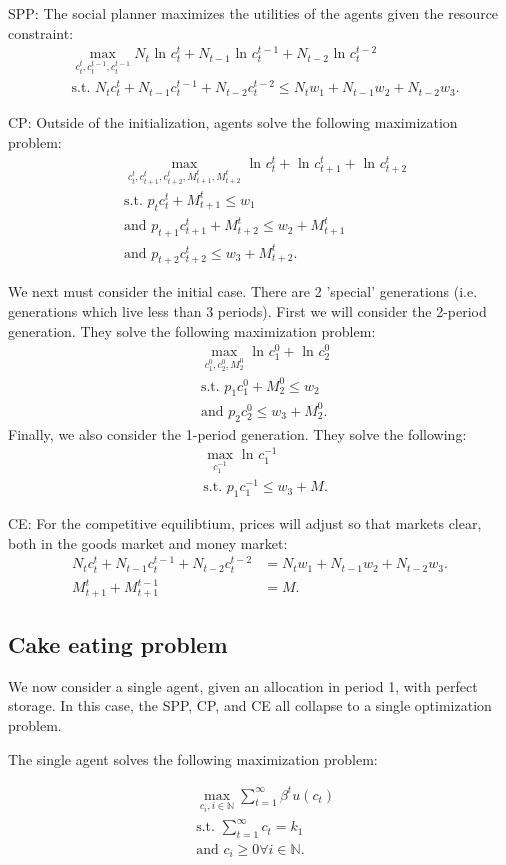 \documentclass[11pt]{article} %
\begin{document}
SPP: The social planner maximizes the utilities of the agents given the resource constraint: 
\begin{align*}
&\max_{c_t^{t},c_{t}^{t-1},c_{t}^{t-1}} N_{t}\text{ ln } c_{t}^{t} + N_{t-1}\text{ ln } c_{t}^{t-1} + N_{t-2}\text{ ln } c_{t}^{t-2}\\
&\text{s.t. }  N_{t}c_{t}^{t} +  N_{t-1}c_{t}^{t-1} + N_{t-2}c_{t}^{t-2}\leq N_{t}w_1 + N_{t-1}w_2 + N_{t-2}w_3.
\end{align*}


CP: Outside of the initialization, agents solve the following maximization problem:
\begin{align*}
&\max_{c_t^{t},c_{t+1}^{t},c_{t+2}^{t},M_{t+1}^{t},M_{t+2}^{t}} \text{ ln } c_{t}^{t} + \text{ ln } c_{t+1}^{t}+ \text{ ln } c_{t+2}^{t}\\
&\text{s.t. }  p_t c_{t}^{t} + M_{t+1}^t \leq w_1 \\
& \text{and } p_{t+1} c_{t+1}^t  + M_{t+2}^t \leq  w_2 + M_{t+1}^t \\
& \text{and } p_{t+2} c_{t+2}^t \leq w_3 + M_{t+2}^t.
\end{align*}

We next must consider the initial case. There are 2 'special' generations (i.e. generations which live less than 3 periods). First we will consider the 2-period generation. They solve the following maximization problem:
\begin{align*}
&\max_{c_{1}^{0},c_{2}^{0},M_{2}^{0}}  \text{ ln } c_{1}^{0}+ \text{ ln } c_{2}^{0}\\
& \text{s.t. } p_{1} c_{1}^0  + M_{2}^0 \leq  w_2 \\
& \text{and } p_{2} c_{2}^0 \leq w_3 + M_{2}^0.
\end{align*}
Finally, we also consider the 1-period generation. They solve the following:
\begin{align*}
&\max_{c_{1}^{-1}}  \text{ ln } c_{1}^{-1}\\
& \text{s.t. } p_{1} c_{1}^{-1} \leq w_3 + M.
\end{align*}

CE: For the competitive equilibtium, prices will adjust so that markets clear, both in the goods market and money market:
\begin{align*}
N_{t}c_{t}^{t} +  N_{t-1}c_{t}^{t-1} + N_{t-2}c_{t}^{t-2} &= N_{t}w_1 + N_{t-1}w_2 + N_{t-2}w_3.\\
M_{t+1}^{t} + M_{t+1}^{t-1} &= M.
\end{align*}

\subsection{Cake eating problem}
We now consider a single agent, given an allocation in period 1, with perfect storage. In this case, the SPP, CP, and CE all collapse to a single optimization problem.

The single agent solves the following maximization problem:

\begin{align*}
&\max_{ c_{i}, i \in \mathbb{N}}  \sum_{t=1}^{\infty}\beta^{t} u(c_t)\\
& \text{s.t. } \sum_{t=1}^{\infty} c_t = k_1\\
& \text{and } c_i \geq 0 \forall i \in \mathbb{N}.
\end{align*}
\end{document}
